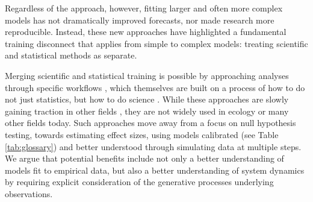 \documentclass[11pt]{article}
\newcommand{\R}[1]{\label{}\linelabel{#1}}
\begin{document}
Regardless of the approach, however, fitting larger and often more complex models has not dramatically improved forecasts, nor made research more reproducible. Instead, these new approaches have highlighted a fundamental training disconnect that applies from simple to complex models: treating scientific and statistical methods as separate.\R{newintroend}

Merging scientific and statistical training is possible by approaching analyses through specific workflows \citep{betanworkflow,grinsztajn2021,vandeschoot2021}, which themselves are built on a process of how to do not just statistics, but how to do science \citep{box1976science}. While these approaches are slowly gaining traction in other fields \citep[e.g.,][]{esfahani2021bayesian,schad2021,bouman2024bayesian}, they are not widely used in ecology or many other fields today. Such approaches move away from a focus on null hypothesis testing, towards estimating effect sizes, using models calibrated (see Table \ref{tab:glossary}) and better understood through simulating data at multiple steps. We argue that potential benefits include not only a better understanding of models fit to empirical data, but also a better understanding of system dynamics by requiring explicit consideration of the generative processes underlying observations. %
\end{document}
